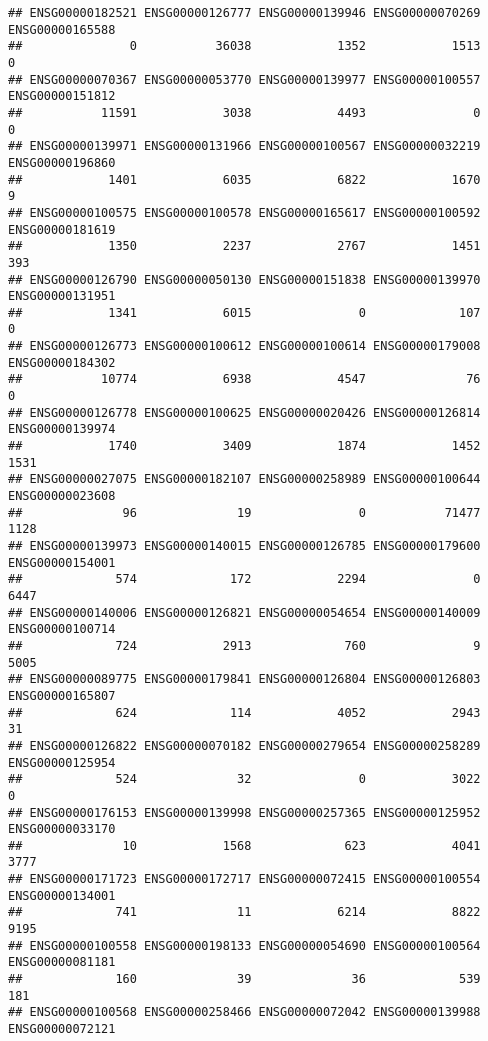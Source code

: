 \documentclass[
]{article}
\begin{document}
\begin{verbatim}
## ENSG00000182521 ENSG00000126777 ENSG00000139946 ENSG00000070269 ENSG00000165588 
##               0           36038            1352            1513               0 
## ENSG00000070367 ENSG00000053770 ENSG00000139977 ENSG00000100557 ENSG00000151812 
##           11591            3038            4493               0               0 
## ENSG00000139971 ENSG00000131966 ENSG00000100567 ENSG00000032219 ENSG00000196860 
##            1401            6035            6822            1670               9 
## ENSG00000100575 ENSG00000100578 ENSG00000165617 ENSG00000100592 ENSG00000181619 
##            1350            2237            2767            1451             393 
## ENSG00000126790 ENSG00000050130 ENSG00000151838 ENSG00000139970 ENSG00000131951 
##            1341            6015               0             107               0 
## ENSG00000126773 ENSG00000100612 ENSG00000100614 ENSG00000179008 ENSG00000184302 
##           10774            6938            4547              76               0 
## ENSG00000126778 ENSG00000100625 ENSG00000020426 ENSG00000126814 ENSG00000139974 
##            1740            3409            1874            1452            1531 
## ENSG00000027075 ENSG00000182107 ENSG00000258989 ENSG00000100644 ENSG00000023608 
##              96              19               0           71477            1128 
## ENSG00000139973 ENSG00000140015 ENSG00000126785 ENSG00000179600 ENSG00000154001 
##             574             172            2294               0            6447 
## ENSG00000140006 ENSG00000126821 ENSG00000054654 ENSG00000140009 ENSG00000100714 
##             724            2913             760               9            5005 
## ENSG00000089775 ENSG00000179841 ENSG00000126804 ENSG00000126803 ENSG00000165807 
##             624             114            4052            2943              31 
## ENSG00000126822 ENSG00000070182 ENSG00000279654 ENSG00000258289 ENSG00000125954 
##             524              32               0            3022               0 
## ENSG00000176153 ENSG00000139998 ENSG00000257365 ENSG00000125952 ENSG00000033170 
##              10            1568             623            4041            3777 
## ENSG00000171723 ENSG00000172717 ENSG00000072415 ENSG00000100554 ENSG00000134001 
##             741              11            6214            8822            9195 
## ENSG00000100558 ENSG00000198133 ENSG00000054690 ENSG00000100564 ENSG00000081181 
##             160              39              36             539             181 
## ENSG00000100568 ENSG00000258466 ENSG00000072042 ENSG00000139988 ENSG00000072121 

\end{verbatim}
\end{document}
